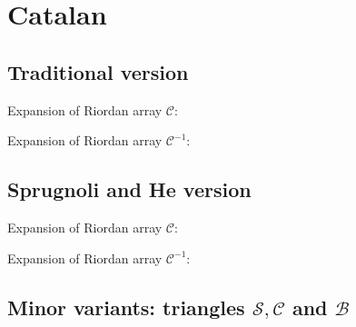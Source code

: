 \documentclass[11pt,a4paper]{article} %
\begin{document}
    \section{Catalan}

    \subsection{Traditional version}

    Expansion of Riordan array $\mathcal{C}$:
    
    Expansion of Riordan array $\mathcal{C}^{-1}$:
    

    
    

    \subsection{Sprugnoli and He version}

    Expansion of Riordan array $\mathcal{C}$:
    
    Expansion of Riordan array $\mathcal{C}^{-1}$:
    

    
    
    
    

    \subsection{Minor variants: triangles $\mathcal{S}, \mathcal{C}$ and $\mathcal{B}$}
\end{document}
